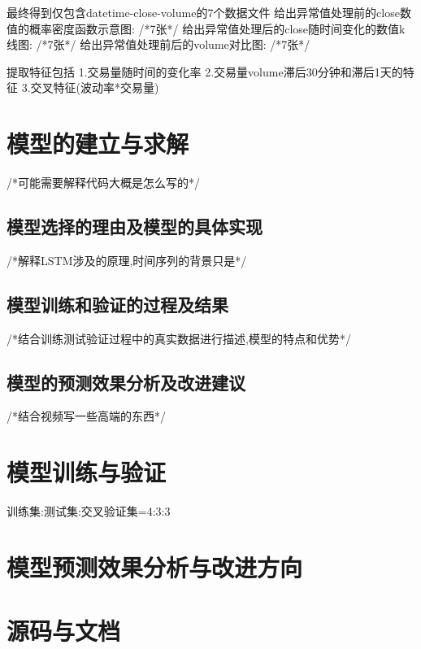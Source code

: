 \documentclass[a4paper,12pt]{ctexart}
\begin{document}
最终得到仅包含datetime-close-volume的7个数据文件
给出异常值处理前的close数值的概率密度函数示意图:
/*7张*/
给出异常值处理后的close随时间变化的数值k线图:
/*7张*/
给出异常值处理前后的volume对比图:
/*7张*/


提取特征包括 1.交易量随时间的变化率 2.交易量volume滞后30分钟和滞后1天的特征 3.交叉特征(波动率*交易量)







\newpage
\section{模型的建立与求解}

/*可能需要解释代码大概是怎么写的*/

\subsection{模型选择的理由及模型的具体实现}
/*解释LSTM涉及的原理,时间序列的背景只是*/

\subsection{模型训练和验证的过程及结果}
/*结合训练测试验证过程中的真实数据进行描述,模型的特点和优势*/

\subsection{模型的预测效果分析及改进建议}
/*结合视频写一些高端的东西*/






\section{模型训练与验证}
训练集:测试集:交叉验证集=4:3:3


\section{模型预测效果分析与改进方向}
\section{源码与文档}
\end{document}
